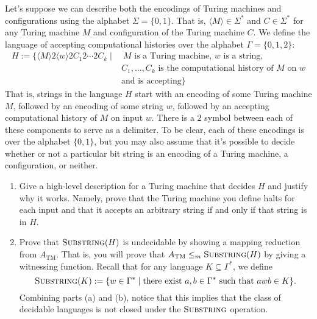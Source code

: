 \begin{enumerate}
Let's suppose we can describe both the encodings of Turing 
machines and configurations using the alphabet 
$\Sigma = \{0,1\}$. 
That is, $\langle M \rangle \in \Sigma^*$ and $C \in 
\Sigma^*$ for any Turing machine $M$ and configuration of the 
Turing machine $C$. We  define the language of accepting 
computational histories over the alphabet $\Gamma = \{0,1, 
2\}$:
\begin{align*}
H:= \{ \langle M \rangle 2 \langle w \rangle 2 C_1 2 \cdots 2 C_k \mid& ~M \textrm{ is a Turing machine, $w$ is a string,} \\
&C_1, \ldots, C_k \text{ is the computational history of } M \text{ on } w \\
&\text{and is accepting} \}
\end{align*}
That is, strings in the language $H$ start with an encoding of 
some Turing machine $M$, followed by an encoding of 
some string $w$, followed by an accepting computational 
history of $M$ on input $w$. There is a $2$ symbol between 
each of these components to serve as a delimiter. To be clear, 
each of these encodings is over the alphabet $\{0,1\}$, but 
you may also assume that it's possible to decide whether or 
not a particular bit string is an encoding of a Turing 
machine, a configuration, or neither.

\begin{enumerate}
\item\gradeCorrect Give a high-level description for 
a Turing machine that decides $H$ and justify 
why it works. Namely, prove that the Turing machine 
you define halts for each input and that it accepts
an arbitrary string if and only if that string is in $H$.
\item\gradeCompleteFirst Prove that $\textsc{Substring}(H)$ is undecidable by showing a mapping reduction from $A_{\mathrm{TM}}$. That is, you will 
prove that $A_{\mathrm{TM}} \le_m \textsc{Substring}(H)$
by giving a witnessing function. Recall that for any language $K \subseteq \Gamma^*$, we define 
\[
    \textsc{Substring}(K) := \{ w \in \Gamma^* \mid \text{there exist } a,b \in \Gamma^* \text{ such that } awb \in K\}.
\]
Combining parts (a) and (b), notice that this implies that the 
class of decidable languages is not closed under the 
$\textsc{Substring}$ operation. 

\end{enumerate}

\end{enumerate}

